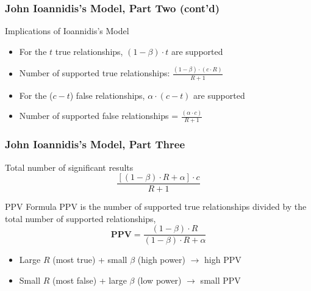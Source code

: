 \documentclass[10pt, block=fill]{beamer}
\begin{document}
\begin{frame}
    \frametitle{John Ioannidis's Model, Part Two (cont'd)}

    \begin{block}{Implications of Ioannidis's Model}
        \begin{itemize}
            \item For the $t$ true relationships, $(1-\beta)\cdot t$ are supported
            \item Number of supported true relationships: $\frac{(1-\beta)\cdot(c\cdot R)}{R+1}$
            \item For the ($c-t$) false relationships, $\alpha\cdot(c-t)$ are supported
            \item Number of supported false relationships = \large{$\frac{(\alpha \cdot c)}{R+1}$}
        \end{itemize}
    \end{block}
\end{frame}
    
\begin{frame}
    \frametitle{John Ioannidis's Model, Part Three}

    \begin{block}{Total number of significant results}
        $$
            \frac{\left[(1-\beta)\cdot R+\alpha\right]\cdot c}{R+1}
        $$
    \end{block}
    
    \begin{block}{PPV Formula}
        PPV is the number of supported true relationships divided by the total number of supported relationships, 
        $$
           \mathbf{PPV}=\frac{(1-\beta)\cdot R}{(1-\beta)\cdot R + \alpha}
        $$
        
    \end{block}

    \begin{itemize}
        \item Large $R$ (most true) + small $\beta$ (high power) $\rightarrow$ high PPV
        \item Small $R$ (most false) + large $\beta$ (low power) $\rightarrow$ small PPV
    \end{itemize}
\end{frame}    
\end{document}
